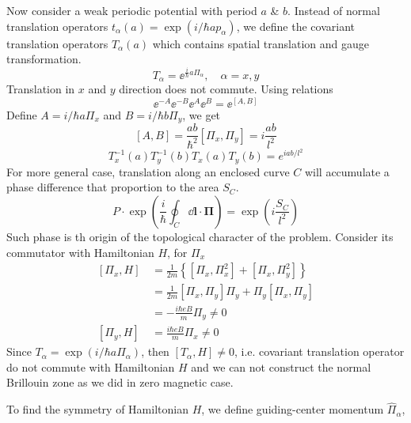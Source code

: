 \documentclass[12pt,a4paper]{article}
\begin{document}
    Now consider a weak periodic potential with period $a$ \& $b$. Instead of normal translation operators $t_{\alpha}(a) = \exp(i/\hbar a p_{\alpha})$, we define the covariant translation operators $T_{\alpha}(a)$ which contains spatial translation and gauge transformation.
    \begin{equation}
    \label{eq:T_MBZ}
        T_{\alpha} = \ee^{\frac{i}{\hbar}a\Pi_{\alpha}}, \quad \alpha = x,y
    \end{equation}
    Translation in $x$ and $y$ direction does not commute. Using relations
    \[
        \ee^{-A} \ee^{-B} \ee^A \ee^B = \ee^{[A, B]}
    \]
    Define $A = i/\hbar a\Pi_x$ and $B = i/\hbar b\Pi_y$, we get
    \[
        [A,B]
        = \frac{ab}{\hbar^2} [\Pi_x, \Pi_y]
        = i \frac{ab}{l^2}
    \]
    \begin{equation}
    \label{eq:TxTy}
        T_x^{-1}(a) T_y^{-1}(b) T_x(a) T_y(b) = e^{iab/l^2}
    \end{equation}
    For more general case, translation along an enclosed curve $C$ will accumulate a phase difference that proportion to the area $S_C$.
    \begin{equation}
        P \cdot \exp\left(\frac{i}{\hbar}\oint_C \dd \mathbf{l} \cdot \bm{\Pi} \right)
        = \exp\left(i\frac{S_C}{l^2}\right)
    \end{equation}
    Such phase is th origin of the topological character of the problem. Consider its commutator with Hamiltonian $H$, for $\Pi_x$
    \[\begin{aligned}
        \left[\Pi_x, H\right]
        &\, = \frac{1}{2m} \left\{\left[ \Pi_x, \Pi_x^2\right] + \left[ \Pi_x, \Pi_y^2\right] \right\} \\
        &\, = \frac{1}{2m} \left[\Pi_x, \Pi_y\right]\Pi_y + \Pi_y\left[\Pi_x, \Pi_y\right] \\
        &\, = -\frac{i\hbar eB}{m} \Pi_y
        \neq 0 \\
        \left[\Pi_y, H\right]
        &\, = \frac{i\hbar eB}{m} \Pi_x
        \neq 0
    \end{aligned}\]
    Since $T_{\alpha} = \exp(i/\hbar a \Pi_{\alpha})$, then $[T_{\alpha}, H] \neq 0$, i.e. covariant translation operator do not commute with Hamiltonian $H$ and we can not construct the normal Brillouin zone as we did in zero magnetic case.

    To find the symmetry of Hamiltonian $H$, we define guiding-center momentum $\hat{\Pi}_{\alpha}$,
\end{document}
